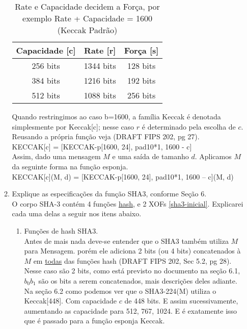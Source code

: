 \documentclass[12pt, a4paper]{article}
\begin{document}
\begin{enumerate}
\begin{enumerate}
\begin{table}[ht!]
  \centering
  \begin{tabular}{|c|c|c|}
    \hline Capacidade [c] & Rate [r] & Força [s] \\
    \hline 256 bits & 1344 bits & 128 bits \\
    \hline 384 bits & 1216 bits & 192 bits \\
    \hline 512 bits & 1088 bits & 256 bits \\
    \hline
  \end{tabular}
  \caption{Rate e Capacidade decidem a Força, por exemplo Rate + Capacidade =
  1600 (Keccak Padrão)}
\end{table}

Quando restringimos ao caso b=1600, a família Keccak é denotada simplesmente
por Keccak[c]; nesse caso $r$ é determinado pela escolha de $c$. Reusando a
própria função veja (DRAFT FIPS 202, pg 27).\\

KECCAK[c] = [KECCAK-p[1600, 24], pad10*1, 1600 - c]\\

Assim, dado uma mensagem $M$ e uma saída de tamanho $d$. Aplicamos $M$ da
seguinte forma na função esponja.\\

KECCAK[c](M, d) = [KECCAK-p[1600, 24], pad10*1, 1600 – c](M,
d)\\

\item Explique as especificações da função SHA3, conforme Seção 6.\\

O corpo SHA-3 contém 4 funções \underline{hash}, e 2 XOFs \ref{sha3-inicial}.
Explicarei cada uma delas a seguir nos itens abaixo.\\

\begin{enumerate}

\item Funções de hash SHA3.\\

Antes de mais nada deve-se entender que o SHA3 também utiliza $M$ para Mensagem.
porém ele adiciona 2 bits (ou 4 bits) concatenados à $M$ em \underline{todas}
das funções hash (DRAFT FIPS 202, Sec 5.2, pg 28). Nesse caso são 2 bits, como
está previsto no documento na seção 6.1, $b_{0}b_{1}$ são os bits a serem
concatenados, mais descrições deles adiante.\\

Na seção 6.2 como podemos ver que o SHA3-224(M) utiliza o
Keccak[448]. Com capacidade $c$ de 448 bits. E assim sucessivamente, aumentando
as capacidade para 512, 767, 1024. E é exatamente isso que é passado para a
função esponja Keccak.\\


\end{enumerate}
\end{enumerate}
\end{enumerate}
\end{document}
